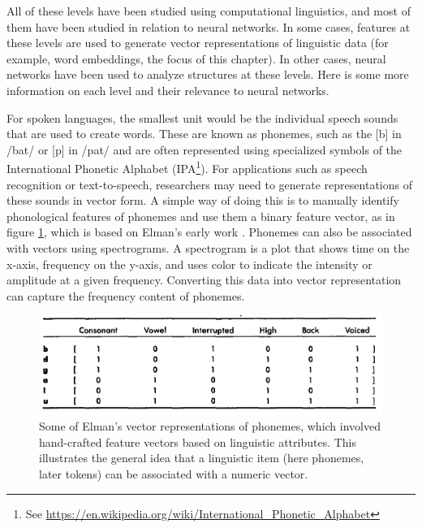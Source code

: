 All of these levels have been studied using computational linguistics, and most of them have been studied in relation to neural networks. In some cases, features at these levels are used to generate vector representations of linguistic data (for example, word embeddings, the focus of this chapter). In other cases, neural networks have been used to analyze structures at these levels. Here is some more information on each level and their relevance to neural networks.

For spoken languages, the smallest unit would be the individual speech sounds that are used to create words. These are known as phonemes, such as the [b] in /bat/ or [p] in /pat/ and are often represented using specialized symbols of the International Phonetic Alphabet (IPA\footnote{See \url{https://en.wikipedia.org/wiki/International_Phonetic_Alphabet}}). For applications such as speech recognition or text-to-speech, researchers may need to generate representations of these sounds in vector form.  A simple way of doing this is to manually identify phonological features of phonemes and use them a binary feature vector, as in figure  \ref{elmanWordEmbeddings}, which is based on Elman's early work \cite{elman1990finding}. Phonemes can also be associated with vectors using spectrograms. A spectrogram is a plot that shows time on the x-axis, frequency on the y-axis, and uses color to indicate the intensity or amplitude at a given frequency. Converting this data into vector representation can capture the frequency content of phonemes.

\begin{figure}[h]
\centering
\includegraphics[scale=.5]{./images/elmanPhonemeEmbeddings.png}
\caption[From \cite{elman1990finding}.]{Some of Elman's vector representations of phonemes, which involved hand-crafted feature vectors based on linguistic attributes. This illustrates the general idea that a linguistic item (here phonemes, later tokens) can be associated with a numeric vector. }
\label{elmanWordEmbeddings}
\end{figure}

